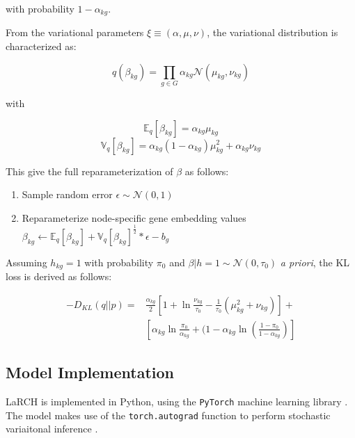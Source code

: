 with probability $1-\alpha_{kg}$.

From the variational parameters $\xi \equiv (\alpha, \mu, \nu)$, the variational distribution is characterized as:

\begin{equation}
    q(\beta_{kg}) = \prod_{g\in G} \alpha_{kg}\mathcal{N}(\mu_{kg}, \nu_{kg})
\end{equation}

with 

\begin{equation}
    \mathbb{E}_q[\beta_{kg}] = \alpha_{kg}\mu_{kg} \label{eq:betahat_est} 
\end{equation}
\begin{equation}
    \mathbb{V}_q[\beta_{kg}] = \alpha_{kg}(1-\alpha_{kg})\mu_{kg}^2 + \alpha_{kg}\nu_{kg} \label{eq:betahat_var}
\end{equation}

This give the full reparameterization of $\beta$ as follows:
\begin{enumerate}
    \item Sample random error $\epsilon\sim\mathcal{N}(0,1)$
    \item Reparameterize node-specific gene embedding values $\beta_{kg} \leftarrow \mathbb{E}_q[\beta_{kg}] + \mathbb{V}_q[\beta_{kg}]^{\frac{1}{2}}*\epsilon - b_g$
\end{enumerate}

Assuming $h_{kg} = 1$ with probability $\pi_0$ and $\beta|h=1 \sim \mathcal{N}(0, \tau_0)$ \textit{a priori}, the KL loss is derived as follows:

\begin{align}
    -D_{KL}(q||p) = &\frac{\alpha_{kg}}{2}\left[1 + \ln \frac{\nu_{kg}}{\tau_0} - \frac{1}{\tau_0}(\mu_{kg}^2 + \nu_{kg})\right] + \\
    &\left[\alpha_{kg}\ln\frac{\pi_0}{\alpha_{kg}} + (1 - \alpha_{kg}\ln\left(\frac{1 - \pi_0}{1 - \alpha_{kg}}\right)\right]
\end{align}

\subsection{Model Implementation}

LaRCH is implemented in Python, using the \texttt{PyTorch} machine learning library \cite{pytorch}. The model makes use of the \texttt{torch.autograd} function to perform stochastic variaitonal inference \cite{pytorchdiff}.

